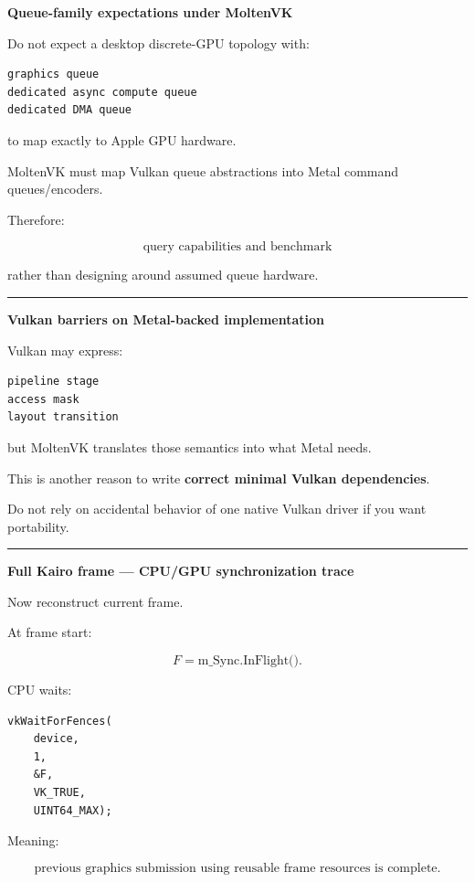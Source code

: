 \textbf{Queue-family expectations under MoltenVK}

Do not expect a desktop discrete-GPU topology with:

\begin{verbatim}
graphics queue
dedicated async compute queue
dedicated DMA queue
\end{verbatim}

to map exactly to Apple GPU hardware.

MoltenVK must map Vulkan queue abstractions into Metal command queues/encoders.

Therefore:

\[
\boxed{
\text{query capabilities and benchmark}
}
\]

rather than designing around assumed queue hardware.

\begin{center}\rule{0.5\linewidth}{0.5pt}\end{center}

\textbf{Vulkan barriers on Metal-backed implementation}

Vulkan may express:

\begin{verbatim}
pipeline stage
access mask
layout transition
\end{verbatim}

but MoltenVK translates those semantics into what Metal needs.

This is another reason to write \textbf{correct minimal Vulkan dependencies}.

Do not rely on accidental behavior of one native Vulkan driver if you want portability.

\begin{center}\rule{0.5\linewidth}{0.5pt}\end{center}

\textbf{Full Kairo frame --- CPU/GPU synchronization trace}

Now reconstruct current frame.

At frame start:

\[
F=\text{m\_Sync.InFlight()}.
\]

CPU waits:

\begin{verbatim}
vkWaitForFences(
    device,
    1,
    &F,
    VK_TRUE,
    UINT64_MAX);
\end{verbatim}

Meaning:

\[
\boxed{
\text{previous graphics submission using reusable frame resources is complete}.
}
\]

